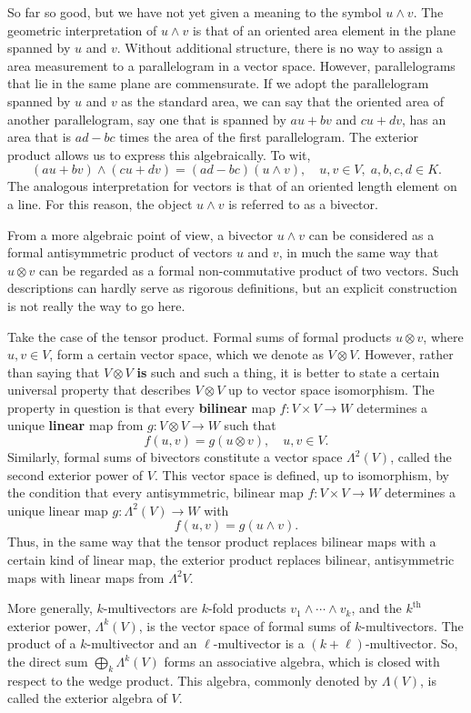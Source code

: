 \documentclass[12pt]{article}
\newcommand{\supth}{^{\text{th}}}
\begin{document}
So far so good, but we have not yet given a meaning to the symbol
$u\wedge v$.  The geometric interpretation of $u\wedge v$ is that of
an oriented area element in the plane spanned by $u$ and $v$.  Without
additional structure, there is no way to assign a area measurement to
a parallelogram in a vector space.  However, parallelograms that lie
in the same plane are commensurate. If we adopt the parallelogram
spanned by $u$ and $v$ as the standard area, we can say that the
oriented area of another parallelogram, say one that is spanned by
$au+bv$ and $cu+dv$, has an area that is $ad-bc$ times the area of the
first parallelogram.  The exterior product allows us to express this
algebraically. To wit,
\[ (au+bv)\wedge(cu+dv) = (ad-bc) (u\wedge v),\quad u,v\in V,\;
a,b,c,d\in K. \] The analogous interpretation for vectors is that of
an oriented length element on a line.  For this reason, the object
$u\wedge v$ is referred to as a bivector.


From a more algebraic point of view, a bivector $u\wedge v$ can be
considered as a formal antisymmetric product of vectors $u$ and $v$,
in much the same way that $u\otimes v$ can be regarded as a formal
non-commutative product of two vectors.  Such descriptions can hardly
serve as rigorous definitions, but an explicit construction is not
really the way to go here.  

Take the case of the tensor product.  Formal sums of formal products
$u\otimes v$, where $u,v\in V$, form a certain vector space, which we
denote as $V\otimes V$.  However, rather than saying that $V\otimes V$
\textbf{is} such and such a thing, it is better to state a certain
universal property that describes $V\otimes V$ up to vector space
isomorphism.  The property in question is that every \textbf{bilinear}
map $f:V\times V\to W$ determines a unique \textbf{linear} map from
$g:V\otimes V\to W$ such that
\[ f(u,v) = g(u\otimes v),\quad u,v \in V.\] Similarly, formal sums of
bivectors constitute a vector space $\Lambda^2(V)$, called the second
exterior power of $V$.  This vector space is defined, up to
isomorphism, by the condition that every antisymmetric, bilinear map
$f:V\times V\to W$ determines a unique linear map $g:\Lambda^2(V) \to
W$ with
\[ f(u,v) = g(u\wedge v).\] Thus, in the same way that the tensor
product replaces bilinear maps with a certain kind of linear map,
the exterior product replaces bilinear, antisymmetric maps with linear
maps from $\Lambda^2 V$.

More generally, $k$-multivectors are $k$-fold products
$v_1\wedge\cdots\wedge v_k$, and the $k\supth$ exterior power,
$\Lambda^k(V)$, is the vector space of formal sums of
$k$-multivectors.  The product of a $k$-multivector and an
$\ell$-multivector is a $(k+\ell)$-multivector.  So, the direct sum
$\bigoplus_k \Lambda^k(V)$ forms an associative algebra, which is
closed with respect to the wedge product.  This algebra, commonly
denoted by $\Lambda(V)$, is called the exterior algebra of $V$.
\end{document}
